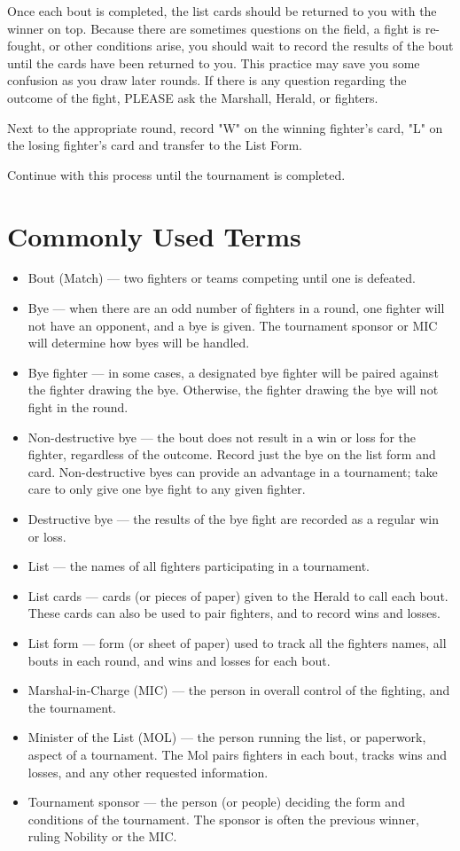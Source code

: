 \documentclass{article}
\begin{document}
Once each bout is completed, the list cards should be returned to you with the winner on top. Because
there are sometimes questions on the field, a fight is re-fought, or other conditions arise, you should wait
to record the results of the bout until the cards have been returned to you. This practice may save you
some confusion as you draw later rounds. If there is any question regarding the outcome of the fight,
PLEASE ask the Marshall, Herald, or fighters.

Next to the appropriate round, record "W" on the winning fighter’s card, "L" on the losing fighter’s card
and transfer to the List Form.

Continue with this process until the tournament is completed.

\section{Commonly Used Terms}

\begin{itemize}
\item Bout (Match) --- two fighters or teams competing until one is defeated.
\item Bye --- when there are an odd number of fighters in a round, one fighter will not have an opponent, and
a bye is given. The tournament sponsor or MIC will determine how byes will be handled.
\item Bye fighter --- in some cases, a designated bye fighter will be paired against the fighter drawing
the bye. Otherwise, the fighter drawing the bye will not fight in the round.
\item Non-destructive bye --- the bout does not result in a win or loss for the fighter, regardless of the
outcome. Record just the bye on the list form and card. Non-destructive byes can provide an
advantage in a tournament; take care to only give one bye fight to any given fighter.
\item Destructive bye --- the results of the bye fight are recorded as a regular win or loss.
\item List --- the names of all fighters participating in a tournament.
\item List cards --- cards (or pieces of paper) given to the Herald to call each bout. These cards can also be
used to pair fighters, and to record wins and losses.
\item List form --- form (or sheet of paper) used to track all the fighters names, all bouts in each round, and
wins and losses for each bout.
\item Marshal-in-Charge (MIC) --- the person in overall control of the fighting, and the tournament.
\item Minister of the List (MOL) --- the person running the list, or paperwork, aspect of a tournament. The
Mol pairs fighters in each bout, tracks wins and losses, and any other requested information.
\item Tournament sponsor --- the person (or people) deciding the form and conditions of the tournament.
The sponsor is often the previous winner, ruling Nobility or the MIC.
\end{itemize}
\end{document}
